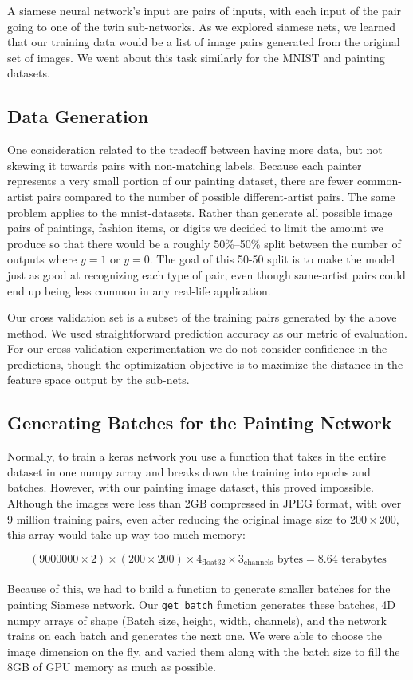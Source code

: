 \documentclass[a4paper, 11pt]{article}
\begin{document}
A siamese neural network’s input are pairs of inputs, with each input of the pair going to one of the twin sub-networks. As we explored siamese nets, we learned that our training data would be a list of image pairs generated from the original set of images. We went about this task similarly for the MNIST and painting datasets.

\subsection{Data Generation}

One consideration related to the tradeoff between having more data, but not skewing it towards pairs with non-matching labels. Because each painter represents a very small portion of our painting dataset, there are fewer common-artist pairs compared to the number of possible different-artist pairs. The same problem applies to the mnist-datasets. Rather than generate all possible image pairs of paintings, fashion items, or digits we decided to limit the amount we produce so that there would be a roughly 50\%--50\% split between the number of outputs where $y=1$ or $y=0$. The goal of this 50-50 split is to make the model just as good at recognizing each type of pair, even though same-artist pairs could end up being less common in any real-life application.

Our cross validation set is a subset of the training pairs generated by the above method. We used straightforward prediction accuracy as our metric of evaluation. For our cross validation experimentation we do not consider confidence in the predictions, though the optimization objective is to maximize the distance in the feature space output by the sub-nets.

\subsection{Generating Batches for the Painting Network}

Normally, to train a keras network you use a function that takes in the entire dataset in one numpy array and breaks down the training into epochs and batches. However, with our painting image dataset, this proved impossible. Although the images were less than 2GB compressed in JPEG format, with over 9 million training pairs, even after reducing the original image size to $200 \times 200$, this array would take up way too much memory:

\[
  (9 000 000 \times 2) \times (200 \times 200) \times 4_\text{float32} \times 3_\text{channels}  \text{ bytes} = 8.64 \text{ terabytes}
\]
\\
Because of this, we had to build a function to generate smaller batches for the painting Siamese network. Our \texttt{get\_batch} function generates these batches, 4D numpy arrays of shape (Batch size, height, width, channels), and the network trains on each batch and generates the next one. We were able to choose the image dimension on the fly, and varied them along with the batch size to fill the 8GB of GPU memory as much as possible.
\end{document}
